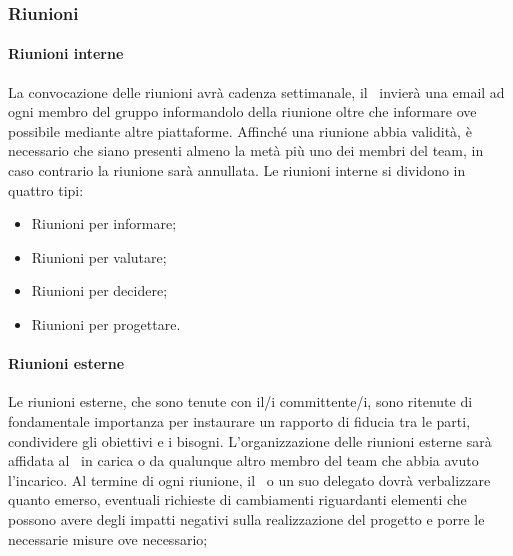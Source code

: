 \documentclass[../NormeDiProgetto.tex]{subfiles}
\begin{document}
\subsubsection{Riunioni}
	\paragraph{Riunioni interne}
		La convocazione delle riunioni avrà cadenza settimanale, il \responsabilediprogetto\ invierà una email ad ogni membro del gruppo informandolo della riunione oltre che informare ove possibile mediante altre piattaforme.
Affinché una riunione abbia validità, è necessario che siano presenti almeno la metà più uno dei membri del team, in caso contrario la riunione sarà annullata.
Le riunioni interne si dividono in quattro tipi:
\begin{itemize}
	\item Riunioni per informare;
	\item Riunioni per valutare;
	\item Riunioni per decidere;
	\item Riunioni per progettare.
\end{itemize}
	\paragraph{Riunioni esterne}
		Le riunioni esterne, che sono tenute con il/i committente/i, sono ritenute di fondamentale importanza per instaurare un rapporto di fiducia tra le parti, condividere gli obiettivi e i bisogni.
L'organizzazione delle riunioni esterne sarà affidata al \responsabilediprogetto\ in carica o da qualunque altro membro del team che abbia avuto l'incarico.
Al termine di ogni riunione, il \responsabilediprogetto\ o un suo delegato dovrà verbalizzare quanto emerso, eventuali richieste di cambiamenti riguardanti elementi che possono avere degli impatti negativi sulla realizzazione del progetto e porre le necessarie misure ove necessario;
\end{document}
